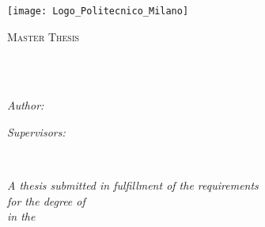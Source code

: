 \documentclass[
11pt, %
oneside, %
english, %
singlespacing, %
toctotoc, %
headsepline, %
]{MastersDoctoralThesis} %
\author{Daniele \textsc{Fornaro}} %
\begin{document}
	
	\frontmatter %
	
	\pagestyle{plain} %
	
	
	\begin{titlepage}
		\begin{center}
			\texttt{[image: Logo\_Politecnico\_Milano]} %
			\\
			\vspace*{.03\textheight}
			{\scshape\LARGE \univname\par}\vspace{1.5cm} %
			\textsc{\Large Master Thesis}\\[0.5cm] %
			
			\HRule \\[0.4cm] %
			{\huge \bfseries \ttitle\par}\vspace{0.4cm} %
			\HRule \\[1.5cm] %
			
			\begin{minipage}[t]{0.35\textwidth}
				\begin{flushleft} \large
					\emph{Author:}\\
					\href{}{\authorname} %
				\end{flushleft}
			\end{minipage}
			\begin{minipage}[t]{0.45\textwidth}
				\begin{flushright} \large
					\emph{Supervisors:} \\
					\href{}{\supname} %
				\end{flushright}
			\end{minipage}\\[3cm]
			
			\vfill
			
			\large \textit{A thesis submitted in fulfillment of the requirements\\ for the degree of \degreename}\\[0.3cm] %
			\textit{in the}\\[0.4cm]
			\facname\\\deptname\\[2cm] %
			

\end{center}
\end{titlepage}
\end{document}
